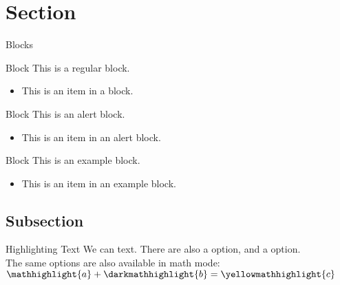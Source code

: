 \section{Section}

\begin{frame}{Blocks}
    \begin{block}{Block}
        This is a regular block.
        \begin{itemize}
            \item This is an item in a block.
        \end{itemize}
    \end{block}

    \begin{alertblock}{Block}
        This is an alert block.
        \begin{itemize}
            \item This is an item in an alert block.
        \end{itemize}
    \end{alertblock}

    \begin{exampleblock}{Block}
        This is an example block.
        \begin{itemize}
            \item This is an item in an example block.
        \end{itemize}
    \end{exampleblock}
\end{frame}

\subsection{Subsection}

\begin{frame}{Highlighting Text}
    We can  text. There are also a  option, and a  option.\\
    The same options are also available in math mode: $\mathhighlight{a} + \darkmathhighlight{b} = \yellowmathhighlight{c}$
\end{frame}